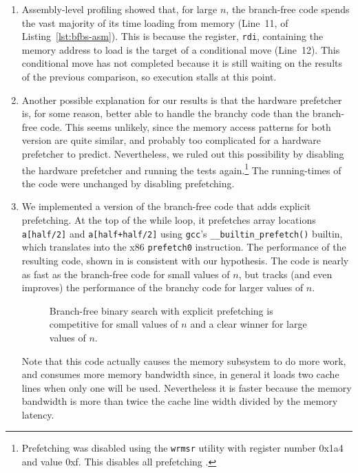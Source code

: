 \documentclass{patmorin}
\newcommand{\lstref}[1]{Listing~\ref{lst:#1}}
\begin{document}
\begin{enumerate}
\item Assembly-level profiling showed that, for large $n$, the
  branch-free code spends the vast majority of its time loading from
  memory (Line~11, of \lstref{bfbs-asm}).  This is because the register,
  \texttt{rdi},  containing the memory address to load is the
  target of a conditional move (Line~12).  This conditional move has not
  completed because it is still waiting on the results of the previous
  comparison, so execution stalls at this point.

\item Another possible explanation for our results is that the hardware
   prefetcher is, for some reason, better able to handle the branchy
   code than the branch-free code.  This seems unlikely, since the memory
   access patterns for both version are quite similar, and probably too
   complicated for a hardware prefetcher to predict. Nevertheless, we
   ruled out this possibility by disabling the hardware prefetcher and
   running the tests again.\footnote{Prefetching was disabled using
   the \texttt{wrmsr} utility with register number 0x1a4 and value 0xf.  This disables all prefetching \cite{intel:optimizing}.}    The running-times
   of the code were unchanged by disabling prefetching.

\item We implemented a version of the branch-free code that adds explicit
   prefetching. At the top of the while loop, it
   prefetches array locations \texttt{a[half/2]}
   and \texttt{a[half+half/2]} using \texttt{gcc}'s
   \texttt{__builtin_prefetch()} builtin, which translates into
   the x86 \texttt{prefetch0} instruction.  The performance of
   the resulting code, shown in  is consistent with our
   hypothesis.  The code is nearly as fast as the branch-free code for
   small values of $n$, but tracks (and even improves) the performance
   of the branchy code for larger values of $n$.

\begin{figure}
   \caption{Branch-free binary search with explicit prefetching is competitive
    for small values of $n$ and a clear winner for large values of $n$.}
\end{figure}

   Note that this code actually causes the memory subsystem to do more
   work, and consumes more memory bandwidth since, in general it loads
   two cache lines when only one will be used.  Nevertheless it is faster
   because the memory bandwidth is more than twice the cache line width
   divided by the memory latency.


\end{enumerate}
\end{document}
